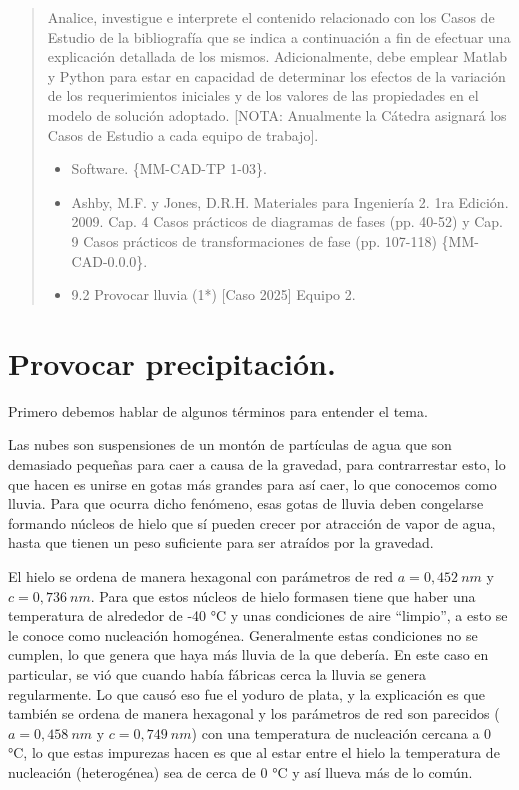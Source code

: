 \documentclass[12pt,a4paper]{article}
\begin{document}

\tableofcontents
\begin{abstract}
    Analice, investigue e interprete el contenido relacionado con los Casos de Estudio de la bibliografía que se indica a continuación a fin de efectuar una explicación detallada de los mismos. Adicionalmente, debe emplear Matlab y Python para estar en capacidad de determinar los efectos de la variación de los requerimientos iniciales y de los valores de las propiedades en el modelo de solución adoptado. [NOTA: Anualmente la Cátedra asignará los Casos de Estudio a cada equipo de trabajo].
    \begin{itemize}
        \item Software. \{MM-CAD-TP 1-03\}.
        \item Ashby, M.F. y Jones, D.R.H. Materiales para Ingeniería 2. 1ra Edición. 2009. Cap. 4 Casos prácticos de diagramas de fases (pp. 40-52) y Cap. 9 Casos prácticos de transformaciones de fase (pp. 107-118) \{MM-CAD-0.0.0\}.
        \item 9.2 Provocar lluvia (1*) [Caso 2025] Equipo 2.
    \end{itemize}
\end{abstract}
\section{Provocar precipitación.}
Primero debemos hablar de algunos términos para entender el tema.

Las nubes son suspensiones de un montón de partículas de agua que son demasiado pequeñas para caer a causa de la gravedad, para contrarrestar esto, lo que hacen es unirse en gotas más grandes para así caer, lo que conocemos como lluvia. Para que ocurra dicho fenómeno, esas gotas de lluvia deben congelarse formando núcleos de hielo que sí pueden crecer por atracción de vapor de agua, hasta que tienen un peso suficiente para ser atraídos por la gravedad.

El hielo se ordena de manera hexagonal con parámetros de red $a=0,452\:nm$ y $c=0,736\:nm$. Para que estos núcleos de hielo formasen tiene que haber una temperatura de alrededor de -40 °C y unas condiciones de aire \textquotedblleft{}limpio\textquotedblright{}, a esto se le conoce como nucleación homogénea. Generalmente estas condiciones no se cumplen, lo que genera que haya más lluvia de la que debería. En este caso en particular, se vió que cuando había fábricas cerca la lluvia se genera regularmente. Lo que causó eso fue el yoduro de plata, y la explicación es que también se ordena de manera hexagonal y los parámetros de red son parecidos ($a=0,458\:nm$ y $c=0,749\: nm$) con una temperatura de nucleación cercana a 0 °C, lo que estas impurezas hacen es que al estar entre el hielo la temperatura de nucleación (heterogénea) sea de cerca de 0 °C y así llueva más de lo común.
\end{document}
